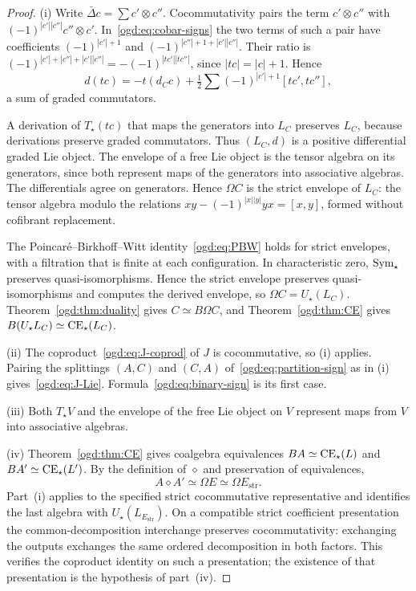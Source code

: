 \begin{proof}
(i) Write \(\bar\Delta c=\sum c'\otimes c''\).
Cocommutativity pairs the term \(c'\otimes c''\) with \((-1)^{|c'||c''|}c''\otimes c'\).
In~\eqref{ogd:eq:cobar-signs} the two terms of such a pair have coefficients \((-1)^{|c'|+1}\) and \((-1)^{|c''|+1+|c'||c''|}\).
Their ratio is \((-1)^{|c'|+|c''|+|c'||c''|}=-(-1)^{|tc'||tc''|}\), since \(|tc|=|c|+1\).
Hence
\[
 d(tc)=-t(d_Cc)+\tfrac12\sum(-1)^{|c'|+1}[tc',tc''],
\]
a sum of graded commutators.

A derivation of \(T_\star(tc)\) that maps the generators into \(L_C\) preserves \(L_C\), because derivations preserve graded commutators.
Thus \((L_C,d)\) is a positive differential graded Lie object.
The envelope of a free Lie object is the tensor algebra on its generators, since both represent maps of the generators into associative algebras.
The differentials agree on generators.
Hence \(\Omega C\) is the strict envelope of \(L_C\): the tensor algebra modulo the relations \(xy-(-1)^{|x||y|}yx=[x,y]\), formed without cofibrant replacement.

The Poincar\'e--Birkhoff--Witt identity~\eqref{ogd:eq:PBW} holds for strict envelopes, with a filtration that is finite at each configuration.
In characteristic zero, \(\operatorname{Sym}_\star\) preserves quasi-isomorphisms.
Hence the strict envelope preserves quasi-isomorphisms and computes the derived envelope, so \(\Omega C=U_\star(L_C)\).
Theorem~\ref{ogd:thm:duality} gives \(C\simeq B\Omega C\), and Theorem~\ref{ogd:thm:CE} gives \(B(U_\star L_C)\simeq\operatorname{CE}_\star(L_C)\).

(ii) The coproduct~\eqref{ogd:eq:J-coprod} of \(J\) is cocommutative, so (i) applies.
Pairing the splittings \((A,C)\) and \((C,A)\) of~\eqref{ogd:eq:partition-sign} as in (i) gives~\eqref{ogd:eq:J-Lie}.
Formula~\eqref{ogd:eq:binary-sign} is its first case.

(iii) Both \(T_\star V\) and the envelope of the free Lie object on \(V\) represent maps from \(V\) into associative algebras.

(iv) Theorem~\ref{ogd:thm:CE} gives coalgebra equivalences
\(BA\simeq\operatorname{CE}_\star(L)\) and \(BA'\simeq\operatorname{CE}_\star(L')\).
By the definition of \(\diamond\) and preservation of equivalences,
\[
 A\diamond A'\simeq\Omega E\simeq\Omega E_{\mathrm{str}}.
\]
Part~\textup{(i)} applies to the specified strict cocommutative representative and identifies the last algebra with \(U_\star(L_{E_{\mathrm{str}}})\).
On a compatible strict coefficient presentation the common-decomposition interchange preserves cocommutativity: exchanging the outputs exchanges the same ordered decomposition in both factors.
This verifies the coproduct identity on such a presentation; the existence of that presentation is the hypothesis of part~\textup{(iv)}.
\end{proof}

